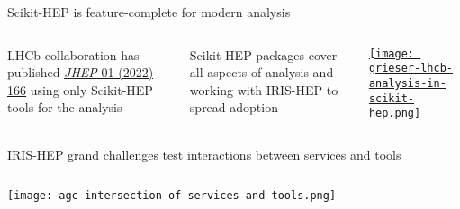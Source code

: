 \begin{frame}{Scikit-HEP is feature-complete for modern analysis}
\vspace{0.25 cm}
\begin{columns}

LHCb collaboration has published \href{https://inspirehep.net/literature/1889335}{\textit{JHEP} 01 (2022) 166} using only Scikit-HEP tools for the analysis

\vspace{0.75 cm}
Scikit-HEP packages cover all aspects of analysis and working with IRIS-HEP to spread adoption

\href{https://indico.cern.ch/event/1126109/contributions/4780169/}{\texttt{[image: grieser-lhcb-analysis-in-scikit-hep.png]}}
\end{columns}
\end{frame}

\begin{frame}{IRIS-HEP grand challenges test interactions between services and tools}
\vspace{0.35 cm}
\begin{columns}
\texttt{[image: agc-intersection-of-services-and-tools.png]}
\end{columns}
\end{frame}

